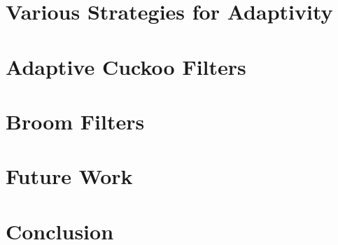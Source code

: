 \documentclass[11pt]{article}
\begin{document}


\section{Various Strategies for Adaptivity}



\section{Adaptive Cuckoo Filters}



\section{Broom Filters}



\section{Future Work}



\section{Conclusion}






\end{document}
